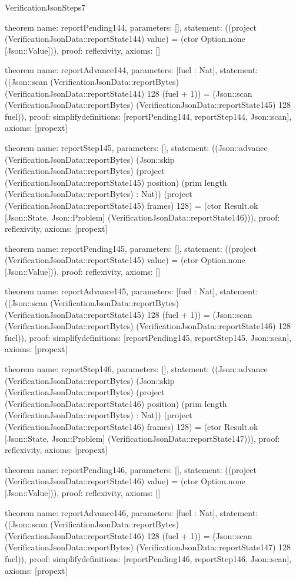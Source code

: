 \begin{lexlean}{VerificationJsonSteps7}
\begin{semanticmodule}
theorem{
  name: reportPending144,
  parameters: [],
  statement: ((project (VerificationJsonData::reportState144) value) = (ctor Option.none [Json::Value])),
  proof: reflexivity{},
  axioms: []
}

theorem{
  name: reportAdvance144,
  parameters: [fuel : Nat],
  statement: ((Json::scan (VerificationJsonData::reportBytes) (VerificationJsonData::reportState144) 128 (fuel + 1)) = (Json::scan (VerificationJsonData::reportBytes) (VerificationJsonData::reportState145) 128 fuel)),
  proof: simplify{definitions: [reportPending144, reportStep144, Json::scan]},
  axioms: [propext]
}

theorem{
  name: reportStep145,
  parameters: [],
  statement: ((Json::advance (VerificationJsonData::reportBytes) (Json::skip (VerificationJsonData::reportBytes) (project (VerificationJsonData::reportState145) position) (prim length (VerificationJsonData::reportBytes) : Nat)) (project (VerificationJsonData::reportState145) frames) 128) = (ctor Result.ok [Json::State, Json::Problem] (VerificationJsonData::reportState146))),
  proof: reflexivity{},
  axioms: [propext]
}

theorem{
  name: reportPending145,
  parameters: [],
  statement: ((project (VerificationJsonData::reportState145) value) = (ctor Option.none [Json::Value])),
  proof: reflexivity{},
  axioms: []
}

theorem{
  name: reportAdvance145,
  parameters: [fuel : Nat],
  statement: ((Json::scan (VerificationJsonData::reportBytes) (VerificationJsonData::reportState145) 128 (fuel + 1)) = (Json::scan (VerificationJsonData::reportBytes) (VerificationJsonData::reportState146) 128 fuel)),
  proof: simplify{definitions: [reportPending145, reportStep145, Json::scan]},
  axioms: [propext]
}

theorem{
  name: reportStep146,
  parameters: [],
  statement: ((Json::advance (VerificationJsonData::reportBytes) (Json::skip (VerificationJsonData::reportBytes) (project (VerificationJsonData::reportState146) position) (prim length (VerificationJsonData::reportBytes) : Nat)) (project (VerificationJsonData::reportState146) frames) 128) = (ctor Result.ok [Json::State, Json::Problem] (VerificationJsonData::reportState147))),
  proof: reflexivity{},
  axioms: [propext]
}

theorem{
  name: reportPending146,
  parameters: [],
  statement: ((project (VerificationJsonData::reportState146) value) = (ctor Option.none [Json::Value])),
  proof: reflexivity{},
  axioms: []
}

theorem{
  name: reportAdvance146,
  parameters: [fuel : Nat],
  statement: ((Json::scan (VerificationJsonData::reportBytes) (VerificationJsonData::reportState146) 128 (fuel + 1)) = (Json::scan (VerificationJsonData::reportBytes) (VerificationJsonData::reportState147) 128 fuel)),
  proof: simplify{definitions: [reportPending146, reportStep146, Json::scan]},
  axioms: [propext]
}


\end{semanticmodule}
\end{lexlean}
